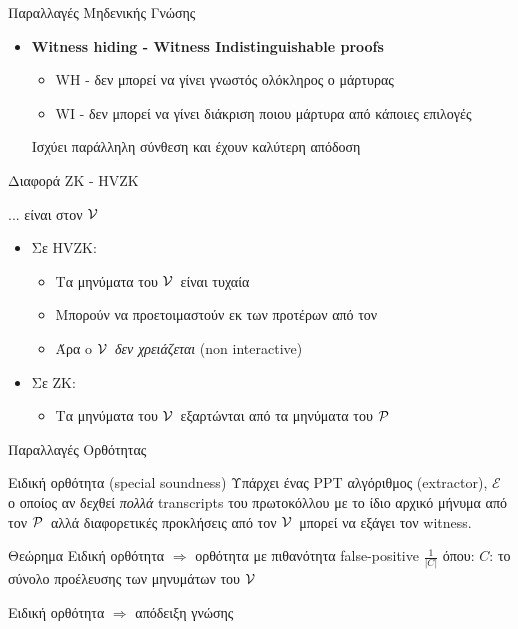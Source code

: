 \documentclass[10pt,handout]{beamer}
\begin{document}
\begin{frame}[allowframebreaks]{Παραλλαγές Μηδενικής Γνώσης}
\begin{itemize}
	\item \textbf{Witness hiding - Witness Indistinguishable proofs}
	\begin{itemize}
		\item WH - δεν μπορεί να γίνει γνωστός ολόκληρος ο μάρτυρας
		\item WI - δεν μπορεί να γίνει διάκριση ποιου μάρτυρα από κάποιες επιλογές
	\end{itemize}

	Ισχύει παράλληλη σύνθεση και έχουν καλύτερη απόδοση
\end{itemize}

\end{frame}

\begin{frame}{Διαφορά ZK - HVZK}
    \begin{block}{... είναι στον $\mathcal{V}\,$}
    \begin{itemize}
        \item Σε HVZK:
        \begin{itemize}
            \item Τα μηνύματα του $\mathcal{V}\,$ είναι τυχαία 
            \item Μπορούν να προετοιμαστούν εκ των προτέρων  από τον \siml
            \item Άρα o $\mathcal{V}\,$ \emph{δεν χρειάζεται} (non interactive)
        \end{itemize} 
        \item Σε ZK:
        \begin{itemize}
            \item Τα μηνύματα του $\mathcal{V}\,$ εξαρτώνται από τα μηνύματα του $\mathcal{P}\,$
        \end{itemize}
    \end{itemize}    
    \end{block}
\end{frame}

\begin{frame}{Παραλλαγές Ορθότητας}
\begin{block}{Ειδική ορθότητα (special soundness)}
Υπάρχει ένας PPT αλγόριθμος (extractor), $\mathcal{E}$ ο οποίος αν δεχθεί \emph{πολλά} transcripts του πρωτοκόλλου με το ίδιο αρχικό μήνυμα από τον $\mathcal{P}\,$ αλλά διαφορετικές προκλήσεις από τον $\mathcal{V}\,$ μπορεί να εξάγει τον witness.
\end{block}
\pause
\begin{block}{Θεώρημα}
Ειδική ορθότητα $\Rightarrow$ ορθότητα με πιθανότητα false-positive $\frac{1}{|C|}$ όπου:
$C$: το σύνολο προέλευσης των μηνυμάτων του $\mathcal{V}\,$

Ειδική ορθότητα $\Rightarrow$ απόδειξη γνώσης
\end{block}
\end{frame}
\end{document}
